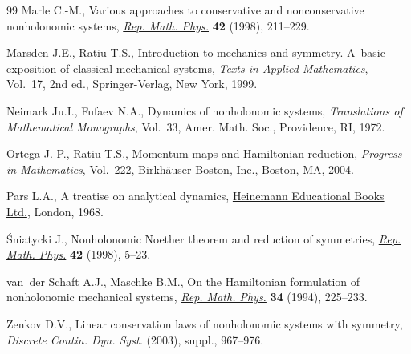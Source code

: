 \begin{thebibliography}{99}
Marle C.-M., Various approaches to conservative and nonconservative nonholonomic
  systems, \href{http://dx.doi.org/10.1016/S0034-4877(98)80011-6}{\textit{Rep. Math. Phys.}} \textbf{42} (1998), 211--229.

Marsden J.E., Ratiu T.S., Introduction to mechanics and symmetry. A~basic
  exposition of classical mechanical systems, \href{http://dx.doi.org/10.1007/978-0-387-21792-5}{\textit{Texts in Applied
  Mathematics}}, Vol.~17, 2nd ed., Springer-Verlag, New York, 1999.

Neimark Ju.I., Fufaev N.A., Dynamics of nonholonomic systems,
  \textit{Translations of Mathematical Monographs}, Vol.~33, Amer. Math. Soc.,
  Providence, RI, 1972.

Ortega J.-P., Ratiu T.S., Momentum maps and {H}amiltonian reduction,
  \href{http://dx.doi.org/10.1007/978-1-4757-3811-7}{\textit{Progress in Mathematics}}, Vol.~222, Birkh\"auser Boston, Inc.,
  Boston, MA, 2004.

Pars L.A., A treatise on analytical dynamics, \href{http://dx.doi.org/10.1007/978-1-4757-3811-7}{Heinemann Educational Books Ltd.},
  London, 1968.

{\'S}niatycki J., Nonholonomic {N}oether theorem and reduction of symmetries,
  \href{http://dx.doi.org/10.1016/S0034-4877(98)80002-5}{\textit{Rep. Math. Phys.}} \textbf{42} (1998), 5--23.

van~der Schaft A.J., Maschke B.M., On the {H}amiltonian formulation of
  nonholonomic mechanical systems, \href{http://dx.doi.org/10.1016/0034-4877(94)90038-8}{\textit{Rep. Math. Phys.}} \textbf{34}
  (1994), 225--233.

Zenkov D.V., Linear conservation laws of nonholonomic systems with symmetry,
  \textit{Discrete Contin. Dyn. Syst.}  (2003), suppl., 967--976.

\end{thebibliography}
